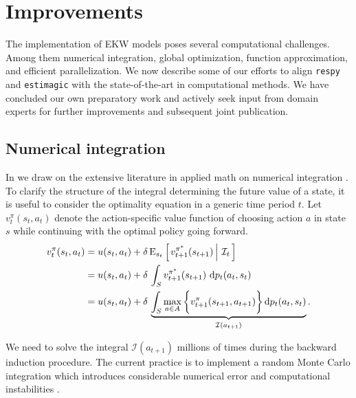 \section{Improvements}\label{Computation}
The implementation of EKW models poses several computational challenges. Among them numerical integration, global optimization, function approximation, and efficient parallelization. We now describe some of our efforts to align \verb+respy+ and \verb+estimagic+ with the state-of-the-art in computational methods. We have concluded our own preparatory work and actively seek input from domain experts for further improvements and subsequent joint publication.
\subsection{Numerical integration}
In \citet{Gabler.2020a} we draw on the extensive literature in applied math on numerical integration \citep{Davis.2007,Gerstner.1998}.\\

\noindent To clarify the structure of the integral determining the future value of a state, it is useful to consider the optimality equation in a generic time period $t$. Let $v^{\pi}_{t}(s_t, a_t)$ denote the action-specific value function of choosing action $a$ in state $s$ while continuing with the optimal policy going forward.
%
\begin{align}
v^{\pi}_{t}(s_t, a_t) & = u(s_t, a_t) + \delta\,\mathrm{E}_{s_t} \left[\left.v^{\pi^*}_{t + 1}(s_{t + 1})\,\right\vert\,\mathcal{I}_t\,\right] \\
& =  u(s_t, a_t) + \delta\, \int_S v^{\pi^*}_{t + 1}(s_{t + 1})\, \mathop{}\!\mathrm{d} p_t(a_t, s_t)\\
& =  u(s_t, a_t) + \delta\, \underbrace{\int_S \max_{a \in A}\bigg\{v^\pi_{t + 1}(s_{t + 1}, a_{t + 1})\bigg\}\mathop{}\!\mathrm{d} p_t(a_t, s_t)}_{\mathcal{I}(a_{t + 1})}.
\end{align}

\noindent We need to solve the integral $\mathcal{I}(a_{t + 1})$ millions of times during the backward induction procedure. The current practice is to implement a random Monte Carlo integration which introduces considerable numerical error and computational instabilities \citep{Judd.2011}.\\

